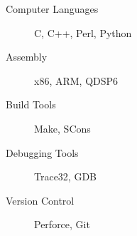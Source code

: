 \begin{description}
\item[Computer Languages] C, C++, Perl, Python
\item[Assembly          ] x86, ARM, QDSP6
\item[Build Tools       ] Make, SCons
\item[Debugging Tools   ] Trace32, GDB
\item[Version Control   ] Perforce, Git
\end{description}
